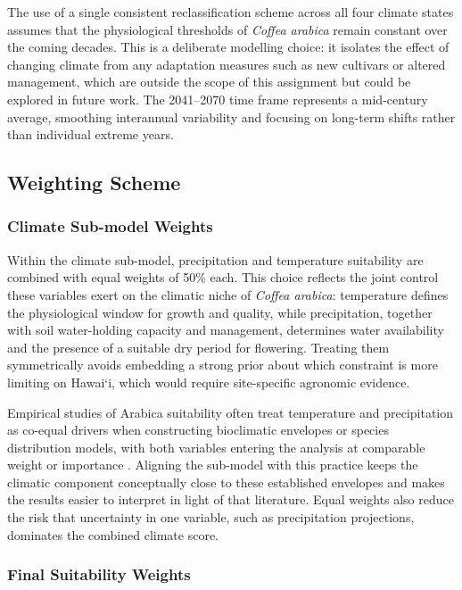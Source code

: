 \documentclass[12pt,a4paper]{article}
\newcommand{\okina}{\textquoteleft}
\begin{document}
The use of a single consistent reclassification scheme across all four climate states assumes that the physiological thresholds of \textit{Coffea arabica} remain constant over the coming decades. This is a deliberate modelling choice: it isolates the effect of changing climate from any adaptation measures such as new cultivars or altered management, which are outside the scope of this assignment but could be explored in future work. The 2041--2070 time frame represents a mid-century average, smoothing interannual variability and focusing on long-term shifts rather than individual extreme years.

\subsection{Weighting Scheme}

\subsubsection{Climate Sub-model Weights}

Within the climate sub-model, precipitation and temperature suitability are combined with equal weights of 50\% each. This choice reflects the joint control these variables exert on the climatic niche of \textit{Coffea arabica}: temperature defines the physiological window for growth and quality, while precipitation, together with soil water-holding capacity and management, determines water availability and the presence of a suitable dry period for flowering. Treating them symmetrically avoids embedding a strong prior about which constraint is more limiting on Hawai\okina i, which would require site-specific agronomic evidence.

Empirical studies of Arabica suitability often treat temperature and precipitation as co-equal drivers when constructing bioclimatic envelopes or species distribution models, with both variables entering the analysis at comparable weight or importance \citep{OchoaCueva2017, SalasLopez2020}. Aligning the sub-model with this practice keeps the climatic component conceptually close to these established envelopes and makes the results easier to interpret in light of that literature. Equal weights also reduce the risk that uncertainty in one variable, such as precipitation projections, dominates the combined climate score.

\subsubsection{Final Suitability Weights}
\end{document}
